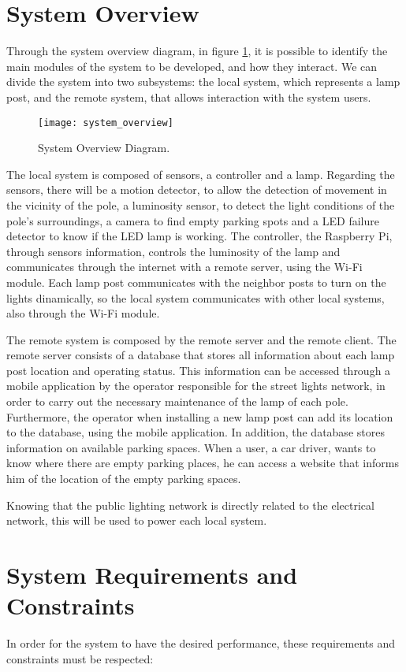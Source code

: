\section{System Overview}
Through the system overview diagram, in figure \ref{fig:system_overview}, it is possible to identify the main modules of the system to be developed, and how they interact. We can divide the system into two subsystems: the local system, which represents a lamp post, and the remote system, that allows interaction with the system users.

\begin{figure}[ht]
	\centering
	\texttt{[image: system\_overview]}
	\caption{System Overview Diagram.}
	\label{fig:system_overview}
\end{figure}

The local system is composed of sensors, a controller and a lamp. Regarding the sensors, there will be a motion detector, to allow the detection of movement in the vicinity of the pole, a luminosity sensor, to detect the light conditions of the pole’s surroundings, a camera to find empty parking spots and a LED failure detector to know if the LED lamp is working. The controller, the Raspberry Pi, through sensors information, controls the luminosity of the lamp and communicates through the internet with a remote server, using the Wi-Fi module. Each lamp post communicates with the neighbor posts to turn on the lights dinamically, so the local system communicates with other local systems, also through the Wi-Fi module.

The remote system is composed by the remote server and the remote client. The remote server consists of a database that stores all information about each lamp post location and operating status. This information can be accessed through a mobile application by the operator  responsible for the street lights network, in order to carry out the necessary maintenance of the lamp of each pole. Furthermore, the operator when installing a new lamp post can add its location to the database, using the mobile application. In addition, the database stores information on available parking spaces. When a user, a car driver, wants to know where there are empty parking places, he can access a website that informs him of the location of the empty parking spaces.

Knowing that the public lighting network is directly related to the electrical network, this will be used to power each local system.

\section{System Requirements and Constraints}
In order for the system to have the desired performance, these requirements and constraints must be respected:

